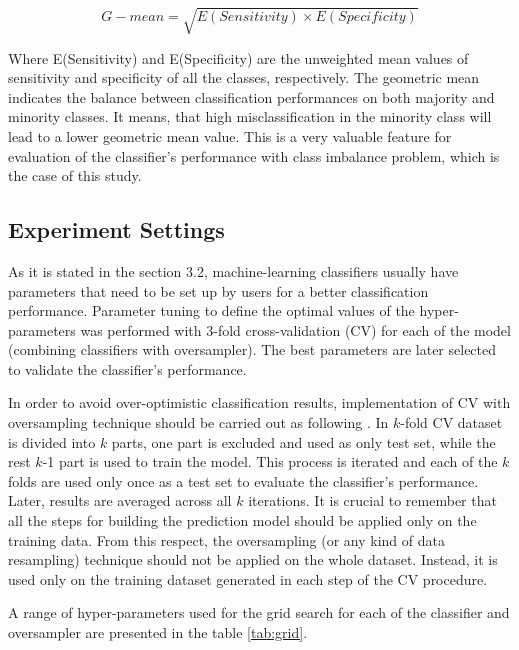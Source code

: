 \documentclass[parskip=full]{scrartcl}
\begin{document}
\begin{itemize}
	\begin{equation}
	G{-}mean = \sqrt{E(Sensitivity) \times E(Specificity)}
	\end{equation}

	Where E(Sensitivity) and E(Specificity) are the unweighted mean values of
	sensitivity and specificity of all the classes, respectively. The geometric
	mean indicates the balance between classification performances on both
	majority and minority classes. It means, that high misclassification in the
	minority class will lead to a lower geometric mean value. This is a very
	valuable feature for evaluation of the classifier's performance with class
	imbalance problem, which is the case of this study.

\end{itemize}

\subsection{Experiment Settings}

As it is stated in the section 3.2, machine-learning classifiers usually have
parameters that need to be set up by users for a better classification
performance. Parameter tuning to define the optimal values of the
hyper-parameters was performed with 3-fold cross-validation (CV) for each of
the model (combining classifiers with oversampler). The best parameters are
later selected to validate the classifier's performance.

In order to avoid over-optimistic classification results, implementation
of CV with oversampling technique should be carried out as following
\cite{Lusa2015}. In $k$-fold CV dataset is divided into $k$ parts, one part is
excluded and used as only test set, while the rest $k$-1 part is used to train
the model. This process is iterated and each of the $k$ folds are used only
once as a test set to evaluate the classifier's performance. Later, results are
averaged across all $k$ iterations. It is crucial to remember that
all the steps for building the prediction model should be applied only on the
training data. From this respect, the oversampling (or any kind of data
resampling) technique should not be applied on the whole dataset. Instead, it
is used only on the training dataset generated in each step of the CV
procedure.

A range of hyper-parameters used for the grid search for each of the
classifier and oversampler are presented in the table \ref{tab:grid}.
\end{document}
